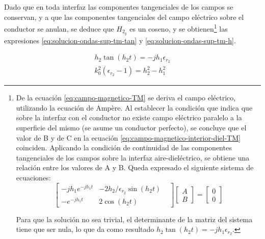Dado que en toda interfaz las componentes tangenciales de los campos se conservan, y a que las componentes tangenciales del campo eléctrico sobre el conductor se anulan, se deduce que $H_{2_y}$ es un coseno, y se obtienen\footnote{De la ecuación \ref{eq:campo-magnetico-TM} se deriva el campo eléctrico, utilizando la ecuación de Ampère. Al establecer la condición que indica que sobre la interfaz con el conductor no existe campo eléctrico paralelo a la superficie del mismo (se asume un conductor perfecto), se concluye que el valor de B y de C en la ecuación \ref{eq:campo-magnetico-interior-diel-TM} coinciden. Aplicando la condición de continuidad de las componentes tangenciales de los campos sobre la interfaz aire-dieléctrico, se obtiene una relación entre los valores de A y B. Queda expresado el siguiente sistema de ecuaciones:
\begin{equation*}
	\begin{bmatrix}
		-j h_1 e^{-j h_1 t} & -2 h_2/\epsilon_{r_2} \sin(h_2 t) &  \\
		 -e^{-j h_1 t} & 2 \cos (h_2 t)
	\end{bmatrix}
	\begin{bmatrix}
		A \\
		B
	\end{bmatrix}
	=
	\begin{bmatrix}
		0 \\
		0
	\end{bmatrix}
\end{equation*}

Para que la solución no sea trivial, el determinante de la matriz del sistema tiene que ser nula, lo que da como resultado $h_2 \tan (h_2 t) = -j h_1 \epsilon_{r_2}$.
} las expresiones \ref{eq:solucion-ondas-sup-tm-tan} y \ref{eq:solucion-ondas-sup-tm-h}.


\begin{align}
	\label{eq:solucion-ondas-sup-tm-tan}
	h_2 \tan (h_2 t) = -j h_1 \epsilon_{r_2} \\
	k_0^2 (\epsilon_{r_2}-1) = h_2^2 - h_1^2
	\label{eq:solucion-ondas-sup-tm-h}
\end{align}


